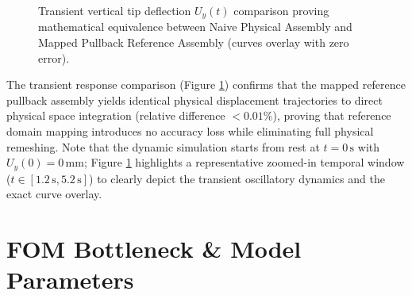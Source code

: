 \begin{figure}[htbp]
    \caption{Transient vertical tip deflection $U_y(t)$ comparison proving mathematical equivalence between Naive Physical Assembly and Mapped Pullback Reference Assembly (curves overlay with zero error).}
    \label{fig:fom_qoi_deflection}
\end{figure}

The transient response comparison (Figure \ref{fig:fom_qoi_deflection}) confirms that the mapped reference pullback assembly yields identical physical displacement trajectories to direct physical space integration (relative difference $< 0.01\%$), proving that reference domain mapping introduces no accuracy loss while eliminating full physical remeshing. Note that the dynamic simulation starts from rest at $t = 0\,\text{s}$ with $U_y(0) = 0\,\text{mm}$; Figure \ref{fig:fom_qoi_deflection} highlights a representative zoomed-in temporal window ($t \in [1.2\,\text{s}, 5.2\,\text{s}]$) to clearly depict the transient oscillatory dynamics and the exact curve overlay.
\newpage
\section{FOM Bottleneck \& Model Parameters}

